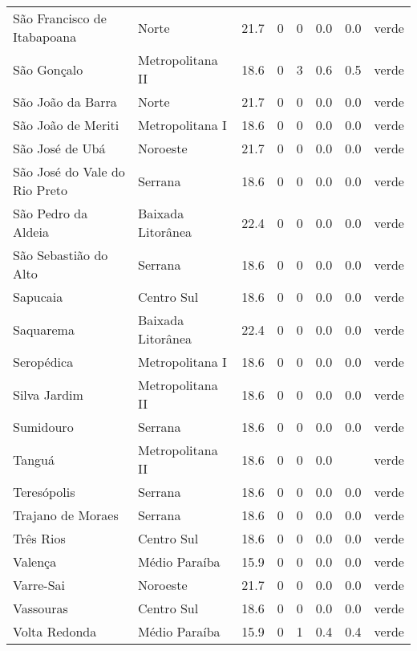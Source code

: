 \begin{longtable}{l|lllllll}
  São Francisco de Itabapoana & Norte & 21.7 & 0 & 0 & 0.0 & 0.0 & verde \\ 
  São Gonçalo & Metropolitana II & 18.6 & 0 & 3 & 0.6 & 0.5 & verde \\ 
  São João da Barra & Norte & 21.7 & 0 & 0 & 0.0 & 0.0 & verde \\ 
  São João de Meriti & Metropolitana I & 18.6 & 0 & 0 & 0.0 & 0.0 & verde \\ 
  São José de Ubá & Noroeste & 21.7 & 0 & 0 & 0.0 & 0.0 & verde \\ 
  São José do Vale do Rio Preto & Serrana & 18.6 & 0 & 0 & 0.0 & 0.0 & verde \\ 
  São Pedro da Aldeia & Baixada Litorânea & 22.4 & 0 & 0 & 0.0 & 0.0 & verde \\ 
  São Sebastião do Alto & Serrana & 18.6 & 0 & 0 & 0.0 & 0.0 & verde \\ 
  Sapucaia & Centro Sul & 18.6 & 0 & 0 & 0.0 & 0.0 & verde \\ 
  Saquarema & Baixada Litorânea & 22.4 & 0 & 0 & 0.0 & 0.0 & verde \\ 
  Seropédica & Metropolitana I & 18.6 & 0 & 0 & 0.0 & 0.0 & verde \\ 
  Silva Jardim & Metropolitana II & 18.6 & 0 & 0 & 0.0 & 0.0 & verde \\ 
  Sumidouro & Serrana & 18.6 & 0 & 0 & 0.0 & 0.0 & verde \\ 
  Tanguá & Metropolitana II & 18.6 & 0 & 0 & 0.0 &  & verde \\ 
  Teresópolis & Serrana & 18.6 & 0 & 0 & 0.0 & 0.0 & verde \\ 
  Trajano de Moraes & Serrana & 18.6 & 0 & 0 & 0.0 & 0.0 & verde \\ 
  Três Rios & Centro Sul & 18.6 & 0 & 0 & 0.0 & 0.0 & verde \\ 
  Valença & Médio Paraíba & 15.9 & 0 & 0 & 0.0 & 0.0 & verde \\ 
  Varre-Sai & Noroeste & 21.7 & 0 & 0 & 0.0 & 0.0 & verde \\ 
  Vassouras & Centro Sul & 18.6 & 0 & 0 & 0.0 & 0.0 & verde \\ 
  Volta Redonda & Médio Paraíba & 15.9 & 0 & 1 & 0.4 & 0.4 & verde \\ 
  \hline
\end{longtable}
